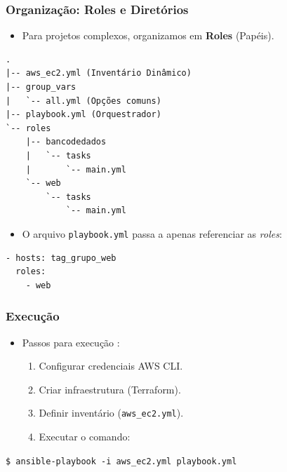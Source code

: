 \documentclass{beamer}
\begin{document}
   \begin{frame}[fragile]
      \frametitle{Organização: Roles e Diretórios}
      \begin{itemize}
      \item Para projetos complexos, organizamos em \textbf{Roles} (Papéis).
      \end{itemize}
      \footnotesize
      \begin{verbatim}
.
|-- aws_ec2.yml (Inventário Dinâmico)
|-- group_vars
|   `-- all.yml (Opções comuns)
|-- playbook.yml (Orquestrador)
`-- roles
    |-- bancodedados
    |   `-- tasks
    |       `-- main.yml
    `-- web
        `-- tasks
            `-- main.yml
      \end{verbatim}
      \normalsize
      \begin{itemize}
      \item O arquivo \texttt{playbook.yml} passa a apenas referenciar as \textit{roles}:
      \end{itemize}
      \footnotesize
      \begin{verbatim}
- hosts: tag_grupo_web
  roles:
    - web
      \end{verbatim}
   \end{frame}

   \begin{frame}
      \frametitle{Execução}
      \begin{itemize}
      \item Passos para execução :
      \begin{enumerate}
      \item Configurar credenciais AWS CLI.
      \item Criar infraestrutura (Terraform).
      \item Definir inventário (\texttt{aws\_ec2.yml}).
      \item Executar o comando:
      \end{enumerate}
      \end{itemize}
      \begin{center}
      \texttt{\$ ansible-playbook -i aws\_ec2.yml playbook.yml}
      \end{center}
   \end{frame}
\end{document}

